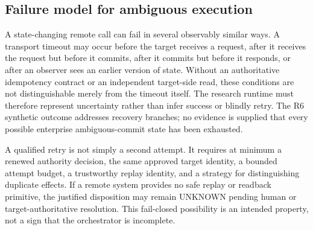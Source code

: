 \documentclass[11pt,twocolumn]{article}
\begin{document}
\subsection{Failure model for ambiguous execution}
A state-changing remote call can fail in several observably similar ways. A transport timeout may occur before the target receives a request, after it receives the request but before it commits, after it commits but before it responds, or after an observer sees an earlier version of state. Without an authoritative idempotency contract or an independent target-side read, these conditions are not distinguishable merely from the timeout itself. The research runtime must therefore represent uncertainty rather than infer success or blindly retry. The R6 synthetic outcome addresses recovery branches; no evidence is supplied that every possible enterprise ambiguous-commit state has been exhausted.

A qualified retry is not simply a second attempt. It requires at minimum a renewed authority decision, the same approved target identity, a bounded attempt budget, a trustworthy replay identity, and a strategy for distinguishing duplicate effects. If a remote system provides no safe replay or readback primitive, the justified disposition may remain UNKNOWN pending human or target-authoritative resolution. This fail-closed possibility is an intended property, not a sign that the orchestrator is incomplete.
\end{document}
